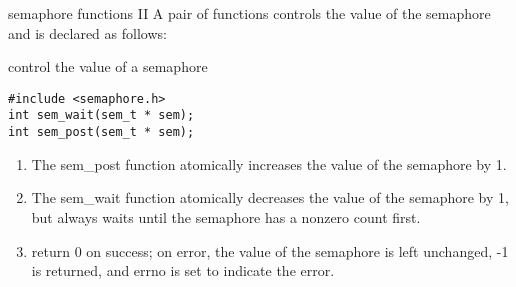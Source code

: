 \documentclass{beamer}
\begin{document}
\begin{frame}[fragile]{semaphore functions II}
A pair of functions controls the value of the semaphore and is declared as follows:
\begin{block}{control the value of a semaphore}
\begin{verbatim}
#include <semaphore.h>
int sem_wait(sem_t * sem); 
int sem_post(sem_t * sem);
\end{verbatim}
\end{block}
\begin{enumerate}
\item
The sem\_post function atomically increases the value of the semaphore by 1. 
\item
The sem\_wait function atomically decreases the value of the semaphore by 1, but always waits until the semaphore has a nonzero count first. 
\item
return 0 on success; on error, the value of the semaphore is left unchanged, -1 is returned, and errno is set to indicate the error.
\end{enumerate}

\end{frame}
\end{document}

